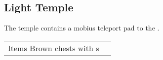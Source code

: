 \subsection{Light Temple}
\label{map:light_temple}

The temple contains a mobius teleport pad to the .


\noindent\begin{tabularx}{\textwidth}[l]{lX}
	Items 
	Brown chests with \nameref{item:cure_potion}s
\end{tabularx}
